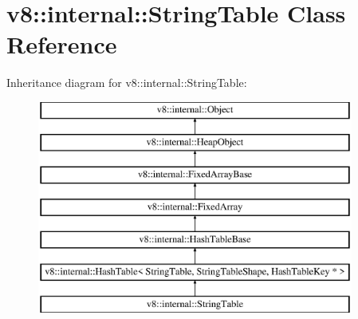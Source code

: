 \hypertarget{classv8_1_1internal_1_1_string_table}{}\section{v8\+:\+:internal\+:\+:String\+Table Class Reference}
\label{classv8_1_1internal_1_1_string_table}
Inheritance diagram for v8\+:\+:internal\+:\+:String\+Table\+:\begin{figure}[H]
\begin{center}
\leavevmode
\includegraphics[height=7.000000cm]{classv8_1_1internal_1_1_string_table}
\end{center}
\end{figure}

